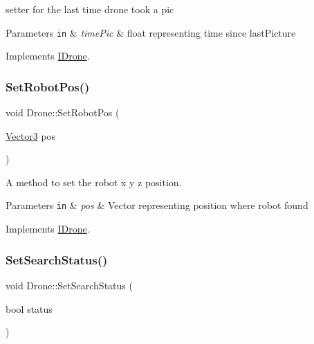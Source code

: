 setter for the last time drone took a pic 


\begin{DoxyParams}[1]{Parameters}
\mbox{\tt in}  & {\em time\+Pic} & float representing time since last\+Picture \\
\hline
\end{DoxyParams}


Implements \hyperlink{classIDrone_aace45f6d9a77bfc8c61bd0ffc30a3b8e}{I\+Drone}.

\mbox{\label{classDrone_a384abec1f84c15ec1c5533d9ccc8b865}} 
\subsubsection{\texorpdfstring{Set\+Robot\+Pos()}{SetRobotPos()}}
{\footnotesize\ttfamily void Drone\+::\+Set\+Robot\+Pos (\begin{DoxyParamCaption}\item[{\hyperlink{classVector3}{Vector3}}]{pos }\end{DoxyParamCaption})\hspace{0.3cm}{\ttfamily [virtual]}}



A method to set the robot x y z position. 


\begin{DoxyParams}[1]{Parameters}
\mbox{\tt in}  & {\em pos} & Vector representing position where robot found \\
\hline
\end{DoxyParams}


Implements \hyperlink{classIDrone_a5851e679bf3c915e93165377cb5c8815}{I\+Drone}.

\mbox{\label{classDrone_a5349ad4b562b038a2d27ede3ed3fa80d}} 
\subsubsection{\texorpdfstring{Set\+Search\+Status()}{SetSearchStatus()}}
{\footnotesize\ttfamily void Drone\+::\+Set\+Search\+Status (\begin{DoxyParamCaption}\item[{bool}]{status }\end{DoxyParamCaption})\hspace{0.3cm}{\ttfamily [virtual]}}



